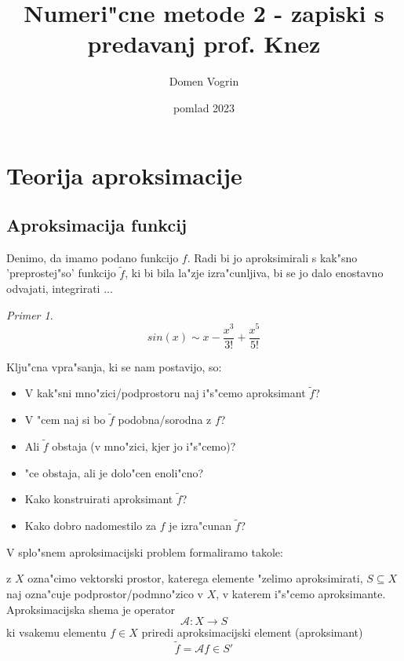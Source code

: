 \documentclass[a4paper,12pt]{article}
\theoremstyle{definition}
\theoremstyle{remark}
\newtheorem*{ex}{Primer}
\begin{document}
\title{Numeri"cne metode 2 - zapiski s predavanj prof. Knez}
\author{Domen Vogrin}
\date{pomlad 2023}
\maketitle


\tableofcontents
\newpage
{}


\section{Teorija aproksimacije}

\subsection{Aproksimacija funkcij}
Denimo, da imamo podano funkcijo $f$. Radi bi jo aproksimirali s kak"sno 'preprostej"so' funkcijo $\tilde{f}$, ki bi bila la"zje izra"cunljiva, bi se jo dalo enostavno odvajati, integrirati ...

\begin{ex}
    \[sin(x) \sim x - \frac{x^3}{3!} + \frac{x^5}{5!}\]
\end{ex}


Klju"cna vpra"sanja, ki se nam postavijo, so:
\begin{itemize}
    \item V kak"sni mno"zici/podprostoru naj i"s"cemo aproksimant $\tilde{f}$?
    \item V "cem naj si bo $\tilde{f}$ podobna/sorodna z $f$?
    \item Ali $\tilde{f}$ obstaja (v mno"zici, kjer jo i"s"cemo)?
    \item "ce obstaja, ali je dolo"cen enoli"cno?
    \item Kako konstruirati aproksimant $\tilde{f}$?
    \item Kako dobro nadomestilo za $f$ je izra"cunan $\tilde{f}$?
\end{itemize}

V splo"snem aproksimacijski problem formaliramo takole:

z $X$ ozna"cimo vektorski prostor, katerega elemente "zelimo aproksimirati, $S \subseteq X$ naj ozna"cuje podprostor/podmno"zico v $X$, v katerem i"s"cemo aproksimante. Aproksimacijska shema je operator 
\[\mathscr{A}\colon X \to S\]
ki vsakemu elementu $f \in X$ priredi aproksimacijski element (aproksimant) \[\tilde{f} = \mathscr{A} f \in S'\]
\end{document}
